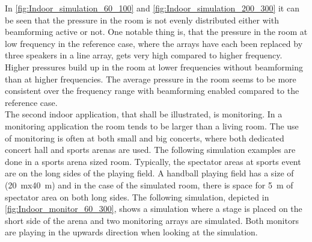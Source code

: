 In \autoref{fig:Indoor_simulation_60_100} and \autoref{fig:Indoor_simulation_200_300} it can be seen that the pressure in the room is not evenly distributed either with beamforming active or not. One notable thing is, that the pressure in the room at low frequency in the reference case, where the arrays have each been replaced by three speakers in a line array, gets very high compared to higher frequency.
Higher pressures build up in the room at lower frequencies without beamforming than at higher frequencies.%
The average pressure in the room seems to be more consistent over the frequency range with beamforming enabled compared to the reference case.\\


The second indoor application, that shall be illustrated, is monitoring. In a monitoring application the room tends to be larger than a living room. The use of monitoring is often at both small and big concerts, where both dedicated concert hall and sports arenas are used. The following simulation examples are done in a sports arena sized room. Typically, the spectator areas at sports event are on the long sides of the playing field. A handball playing field has a size of (\SI{20}{\meter}x\SI{40}{\meter}) and in the case of the simulated room, there is space for \SI{5}{\meter} of spectator area on both long sides. The following simulation, depicted in \autoref{fig:Indoor_monitor_60_300}, shows a simulation where a stage is placed on the short side of the arena and two monitoring arrays are simulated. Both monitors are playing in the upwards direction when looking at the simulation.


